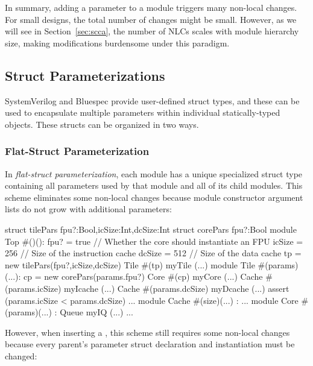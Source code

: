 In summary, adding a parameter to a module triggers many non-local changes. For small designs, the total number of changes might be small. However, as we will see in Section~\ref{sec:scca}, the number of NLCs scales with module hierarchy size, making modifications burdensome under this paradigm.

\subsection{Struct Parameterizations}

SystemVerilog and Bluespec provide user-defined struct types, and these can be used to encapsulate multiple parameters within individual statically-typed objects. These structs can be organized in two ways.

\subsubsection{Flat-Struct Parameterization}

In \emph{flat-struct parameterization}, each module has a unique specialized struct type containing all parameters used by that module and all of its child modules. This scheme eliminates some non-local changes because module constructor argument lists do not grow with additional parameters:

\begin{phdl}
struct tilePars {fpu?:Bool,icSize:Int,dcSize:Int}
struct corePars {fpu?:Bool}
module Top #()():
  fpu? = true    // Whether the core should instantiate an FPU
  icSize = 256   // Size of the instruction cache
  dcSize = 512   // Size of the data cache
  tp = new tilePars(fpu?,icSize,dcSize)
  Tile #(tp) myTile (...)
module Tile #(params)(...):
  cp = new corePars(params.fpu?)
  Core  #(cp) myCore (...)
  Cache #(params.icSize) myIcache (...)
  Cache #(params.dcSize) myDcache (...)
  assert (params.icSize < params.dcSize) ...
module Cache #(size)(...) : ...
module Core #(params)(...) :
  Queue myIQ (...) ...
\end{phdl} 

However, when inserting a , this scheme still requires some non-local changes because every parent's parameter struct declaration and instantiation must be changed:


